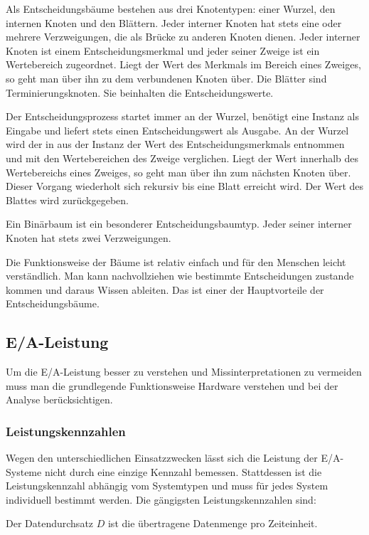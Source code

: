 Als Entscheidungsbäume bestehen aus drei Knotentypen: einer Wurzel, den internen Knoten und den Blättern. 
Jeder interner Knoten hat stets eine oder mehrere Verzweigungen, die als Brücke zu anderen Knoten dienen. 
Jeder interner Knoten ist einem Entscheidungsmerkmal und jeder seiner Zweige ist ein Wertebereich zugeordnet. 
Liegt der Wert des Merkmals im Bereich eines Zweiges, so geht man über ihn zu dem verbundenen Knoten über. 
Die Blätter sind Terminierungsknoten. 
Sie beinhalten die Entscheidungswerte. 

Der Entscheidungsprozess startet immer an der Wurzel, benötigt eine Instanz als Eingabe und liefert stets einen Entscheidungswert als Ausgabe. 
An der Wurzel wird der in aus der Instanz der Wert des Entscheidungsmerkmals entnommen und mit den Wertebereichen des Zweige verglichen. 
Liegt der Wert innerhalb des Wertebereichs eines Zweiges, so geht man über ihn zum nächsten Knoten über. 
Dieser Vorgang wiederholt sich rekursiv bis eine Blatt erreicht wird. Der Wert des Blattes wird zurückgegeben. 

Ein Binärbaum ist ein besonderer Entscheidungsbaumtyp. 
Jeder seiner interner Knoten hat stets zwei Verzweigungen. 

Die Funktionsweise der Bäume ist relativ einfach und für den Menschen leicht verständlich. 
Man kann nachvollziehen wie bestimmte Entscheidungen zustande kommen und daraus Wissen ableiten. 
Das ist einer der Hauptvorteile der Entscheidungsbäume.


\subsection{E/A-Leistung}
Um die E/A-Leistung besser zu verstehen und Missinterpretationen zu vermeiden muss man die grundlegende Funktionsweise Hardware verstehen und bei der Analyse berücksichtigen. 

\subsubsection{Leistungskennzahlen}
Wegen den unterschiedlichen Einsatzzwecken lässt sich die Leistung der E/A-Systeme nicht durch eine einzige Kennzahl bemessen. 
Stattdessen ist die Leistungskennzahl abhängig vom Systemtypen und muss für jedes System individuell bestimmt werden. 
Die gängigsten Leistungskennzahlen sind:

\begin{term}[Datendurchsatz] %
	Der Datendurchsatz $D$ ist die übertragene Datenmenge pro Zeiteinheit.
\end{term}

